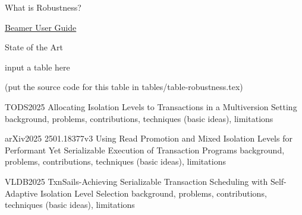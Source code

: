 
\begin{frame}{What is Robustness?}
  \begin{center}
    \href{https://ctan.math.washington.edu/tex-archive/macros/latex/contrib/beamer/doc/beameruserguide.pdf}{Beamer User Guide}
  \end{center}
\end{frame}

\begin{frame}{State of the Art}
	

	input a table here

	(put the source code for this table in tables/table-robustness.tex)
\end{frame}

\begin{frame}{TODS2025 Allocating Isolation Levels to Transactions in a Multiversion Setting}
	background, problems, contributions, techniques (basic ideas), limitations
\end{frame}

\begin{frame}{arXiv2025 2501.18377v3 Using Read Promotion and Mixed Isolation Levels for Performant Yet Serializable Execution of Transaction Programs}
	background, problems, contributions, techniques (basic ideas), limitations
\end{frame}

\begin{frame}{VLDB2025 TxnSails-Achieving Serializable Transaction Scheduling with Self-Adaptive Isolation Level Selection}
	background, problems, contributions, techniques (basic ideas), limitations
\end{frame}
